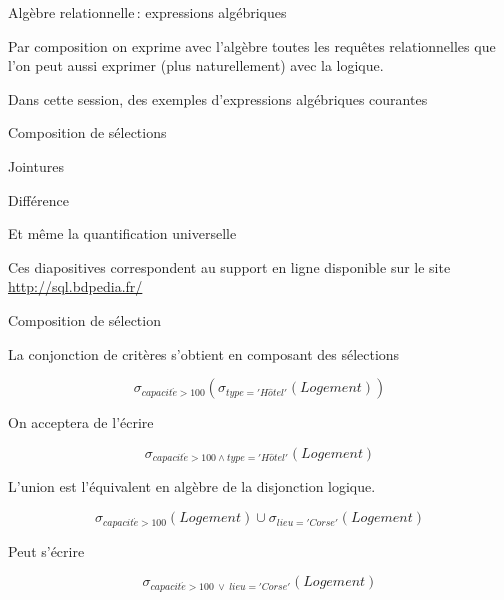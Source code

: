 
\begin{frame}[fragile]{Algèbre relationnelle\,: expressions algébriques}

Par \alert{composition} on exprime avec l'algèbre toutes les requêtes relationnelles
que l'on peut aussi exprimer (plus naturellement) avec la logique.

\vfill

Dans cette session, des exemples d'\alert{expressions algébriques} courantes

\begin{redbullet}
  \item Composition de sélections
  \item Jointures
  \item Différence
  \item Et même la quantification universelle
\end{redbullet}

\vfill

\begin{blocgauche}
\alert{Ces diapositives correspondent au support en ligne disponible sur
le site \url{http://sql.bdpedia.fr/}}
\end{blocgauche}

\end{frame}


\begin{frame}{Composition de sélection }

La \alert{conjonction} de critères s'obtient en composant des sélections

     $$\sigma_{capacit\acute{e}>100}(\sigma_{type='H\hat{o}tel'}(Logement))$$
     
\vfill

On acceptera de l'écrire

   $$\sigma_{capacit\acute{e}>100 \land type='H\hat{o}tel'}(Logement)$$

\vfill

\alert{L'union} est l'équivalent en algèbre de la \alert{disjonction} logique.

$$ \sigma_{capacit\acute{e}>100}(Logement) \cup \sigma_{lieu='Corse'}(Logement)$$


\vfill

Peut s'écrire

    $$\sigma_{capacit\acute{e}>100\ \lor\  lieu='Corse'}(Logement)$$
\end{frame}

